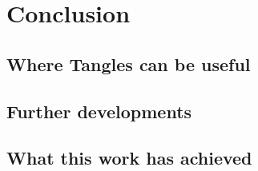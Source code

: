 \chapter{Conclusion}\label{conclusion}
\section{Where Tangles can be useful}
\section{Further developments}
\section{What this work has achieved}
